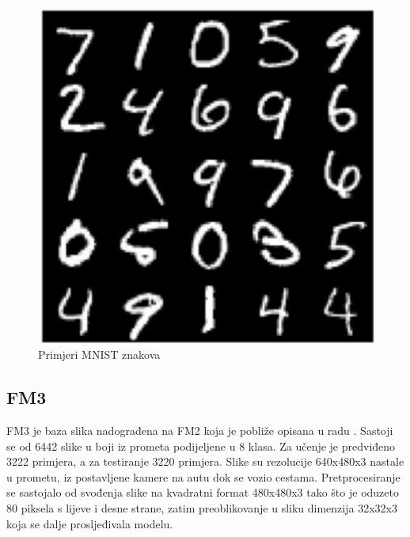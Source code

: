 \documentclass[times, utf8, diplomski]{fer}
\begin{document}
\begin{figure}[H]
    \centering
    \includegraphics[scale=0.25]{Slike/mnist}
    \caption{Primjeri MNIST znakova}
\end{figure}

\subsection{FM3}
FM3 je baza slika nadograđena na FM2 koja je pobliže opisana u radu \cite{sikiric}. Sastoji se od 6442 slike u boji iz prometa podijeljene u 8 klasa. Za učenje je predviđeno 3222 primjera, a za testiranje 3220 primjera. Slike su rezolucije 640x480x3 nastale u prometu, iz postavljene kamere na autu dok se vozio cestama. Pretprocesiranje se sastojalo od svođenja slike na kvadratni format 480x480x3 tako što je oduzeto 80 piksela s lijeve i desne strane, zatim preoblikovanje u sliku dimenzija 32x32x3 koja se dalje prosljeđivala modelu.
\end{document}
